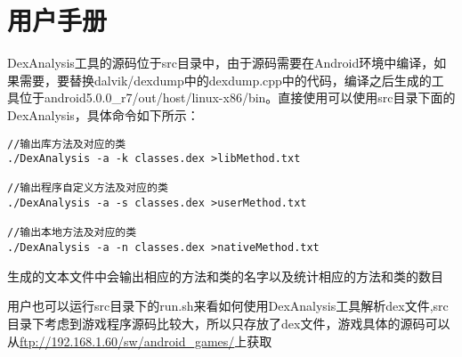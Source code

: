 \section{用户手册}
DexAnalysis工具的源码位于src目录中，由于源码需要在Android环境中编译，如果需要，要替换dalvik/dexdump中的dexdump.cpp中的代码，编译之后生成的工具位于android5.0.0\_r7/out/host/linux-x86/bin。直接使用可以使用src目录下面的DexAnalysis，具体命令如下所示：
\begin{lstlisting}
//输出库方法及对应的类
./DexAnalysis -a -k classes.dex >libMethod.txt

//输出程序自定义方法及对应的类
./DexAnalysis -a -s classes.dex >userMethod.txt

//输出本地方法及对应的类
./DexAnalysis -a -n classes.dex >nativeMethod.txt
\end{lstlisting}

生成的文本文件中会输出相应的方法和类的名字以及统计相应的方法和类的数目

用户也可以运行src目录下的run.sh来看如何使用DexAnalysis工具解析dex文件,src目录下考虑到游戏程序源码比较大，所以只存放了dex文件，游戏具体的源码可以从\url{ftp://192.168.1.60/sw/android_games/}上获取
